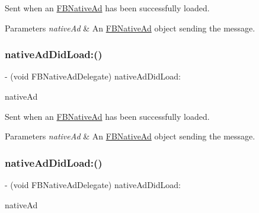 Sent when an \hyperlink{interfaceFBNativeAd}{F\+B\+Native\+Ad} has been successfully loaded.


\begin{DoxyParams}{Parameters}
{\em native\+Ad} & An \hyperlink{interfaceFBNativeAd}{F\+B\+Native\+Ad} object sending the message. \\
\hline
\end{DoxyParams}
\mbox{\label{protocolFBNativeAdDelegate_01-p_abad2ba96d5837eee4c2c7f88e216a9f5}} 
\subsubsection{\texorpdfstring{native\+Ad\+Did\+Load\+:()}{nativeAdDidLoad:()}\hspace{0.1cm}{\footnotesize\ttfamily [3/5]}}
{\footnotesize\ttfamily -\/ (void F\+B\+Native\+Ad\+Delegate) native\+Ad\+Did\+Load\+: \begin{DoxyParamCaption}\item[{(\hyperlink{interfaceFBNativeAd}{F\+B\+Native\+Ad} $\ast$)}]{native\+Ad }\end{DoxyParamCaption}}

Sent when an \hyperlink{interfaceFBNativeAd}{F\+B\+Native\+Ad} has been successfully loaded.


\begin{DoxyParams}{Parameters}
{\em native\+Ad} & An \hyperlink{interfaceFBNativeAd}{F\+B\+Native\+Ad} object sending the message. \\
\hline
\end{DoxyParams}
\mbox{\label{protocolFBNativeAdDelegate_01-p_abad2ba96d5837eee4c2c7f88e216a9f5}} 
\subsubsection{\texorpdfstring{native\+Ad\+Did\+Load\+:()}{nativeAdDidLoad:()}\hspace{0.1cm}{\footnotesize\ttfamily [4/5]}}
{\footnotesize\ttfamily -\/ (void F\+B\+Native\+Ad\+Delegate) native\+Ad\+Did\+Load\+: \begin{DoxyParamCaption}\item[{(\hyperlink{interfaceFBNativeAd}{F\+B\+Native\+Ad} $\ast$)}]{native\+Ad }\end{DoxyParamCaption}}

